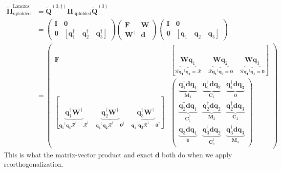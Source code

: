 \begin{align}
    \bm{\tilde{H}}_{\text{upfolded}}^{\text{Lanczos Iter 3}} &= \bm{\tilde{Q}}^{(3,\dagger)} \bm{H}_{\text{upfolded}} \bm{\tilde{Q}}^{(3)}\\
    &= \begin{pmatrix}
        \bm{I} & \bm{0} \\
        \bm{0} & [\bm{q}_1^{\dag}\quad \bm{q}_2^{\dag} \quad \bm{q}_3^{\dag}]
    \end{pmatrix}
    \begin{pmatrix}
        \bm{F} & \bm{W}\\
        \bm{W}^{\dagger} & \bm{d}
    \end{pmatrix}
    \begin{pmatrix}
        \bm{I} & \bm{0} \\
        \bm{0} & [\bm{q}_1\quad \bm{q}_2 \quad \bm{q}_3]
    \end{pmatrix}\\
    &= \begin{pmatrix}
        \bm{F} & [\underbrace{\bm{W}\bm{q}_1}_{\bm{\mathcal{R}}\bm{q_1}^{\dag}\bm{q_1}=\bm{\mathcal{R}}} \quad \underbrace{\bm{W}\bm{q}_2}_{\bm{\mathcal{R}}\bm{q_1}^{\dag}\bm{q}_2=\bm{0}} \quad \underbrace{\bm{W}\bm{q}_3}_{\bm{\mathcal{R}}\bm{q_1}^{\dag}\bm{q}_3=\bm{0}}] \\
        [\underbrace{\bm{q}_1^{\dag}\bm{W}^{\dagger}}_{\bm{q_1}^{\dagger}\bm{q_1}\bm{\mathcal{R}}^{\dagger}= \bm{\mathcal{R}}^{\dagger}}\quad \underbrace{\bm{q}_2^{\dag}\bm{W}^{\dagger}}_{\bm{q_1}^{\dagger}\bm{q_2}\bm{\mathcal{R}}^{\dagger}= \bm{0}^{\dagger}} \quad \underbrace{\bm{q}_3^{\dag}\bm{W}^{\dagger}}_{\bm{q_1}^{\dagger}\bm{q_3}\bm{\mathcal{R}}^{\dagger}= \bm{0}^{\dagger}}] 
& \begin{pmatrix}
            \underbrace{\bm{q}_1^{\dag}\bm{d}\bm{q}_1}_{\bm{M}_1} & \underbrace{\bm{q}_1^{\dag}\bm{d}\bm{q}_2}_{\bm{C}_1} & \underbrace{\bm{q}_1^{\dag}\bm{d}\bm{q}_3}_{\bm{0}}\\
            \underbrace{\bm{q}_2^{\dag}\bm{d}\bm{q}_1}_{\bm{C}_1^{\dagger}} & \underbrace{\bm{q}_2^{\dag}\bm{d}\bm{q}_2}_{\bm{M}_2} & \underbrace{\bm{q}_2^{\dag}\bm{d}\bm{q}_3}_{\bm{C}_2}\\
            \underbrace{\bm{q}_3^{\dag}\bm{d}\bm{q}_1}_{\bm{0}} & \underbrace{\bm{q}_3^{\dag}\bm{d}\bm{q}_2}_{\bm{C}_2^\dag} & \underbrace{\bm{q}_3^{\dag}\bm{d}\bm{q}_3}_{\bm{M}_3}
        \end{pmatrix}
    \end{pmatrix}
    \label{eqn:lanczos_projection}
\end{align}
This is what the matrix-vector product and exact $\bm{d}$ both do when we apply reorthogonalization.
